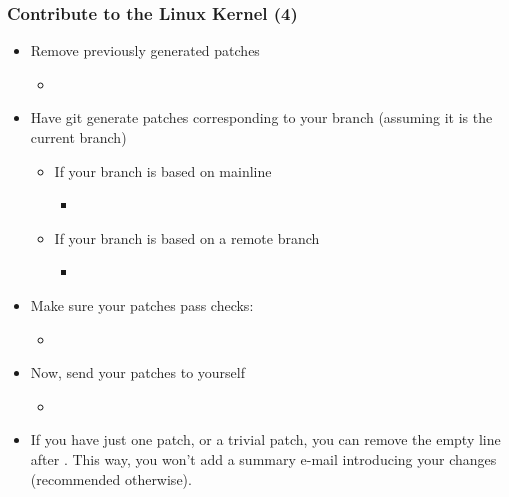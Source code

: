 \begin{frame}
  \frametitle{Contribute to the Linux Kernel (4)}
  \begin{itemize}
  \item Remove previously generated patches
    \begin{itemize}
    \item {}
    \end{itemize}
  \item Have git generate patches corresponding to your branch
    (assuming it is the current branch)
    \begin{itemize}
    \item If your branch is based on mainline
      \begin{itemize}
      \item {}
      \end{itemize}
    \item If your branch is based on a remote branch
      \begin{itemize}
      \item {}
      \end{itemize}
    \end{itemize}
  \item Make sure your patches pass  checks:
    \begin{itemize}
    \item {}
    \end{itemize}
  \item Now, send your patches to yourself
    \begin{itemize}
    \item {}
    \end{itemize}
  \item If you have just one patch, or a trivial patch, you can remove
    the empty line after . This way, you won't add
    a summary e-mail introducing your changes (recommended otherwise).
  \end{itemize}
\end{frame}


